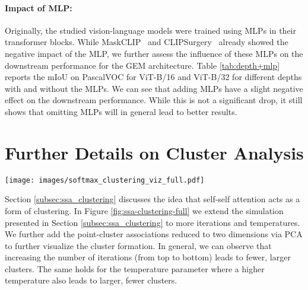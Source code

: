 \documentclass[10pt,twocolumn,letterpaper]{article}
\begin{document}
\paragraph{Impact of MLP:}
Originally, the studied vision-language models were trained using MLPs in their transformer blocks. While MaskCLIP~\citep{dong2023maskclip} and CLIPSurgery~\citep{li2023clipsurgery} already showed the negative impact of the MLP,  we further assess the influence of these MLPs on the downstream performance for the GEM architecture.
Table \ref{tab:depth+mlp} reports the mIoU on PascalVOC for ViT-B/16 and ViT-B/32 for different depths with and without the MLPs. We can see that adding MLPs have a slight negative effect on the downstream performance. While this is not a significant drop, it still shows that omitting MLPs will in general lead to better results.


\section{Further Details on Cluster Analysis} \label{appendix:analysis}

\begin{figure*}\centering
    \vspace{-1em}
\texttt{[image: images/softmax\_clustering\_viz\_full.pdf]}
    \vspace{-1.5em}
    \caption{
    Visualization of self-self attention on a set of 20 vectors: In the top 3 rows, a set of 20 vectors undergoing self-self attention for iterations   and temperatures . Displayed are the 20 data points (reduced to two dimensions via PCA) and their color represents a smooth cluster membership (the vector into which they are transformed is translated into a color value.) We further show the attention matrix for each configuration (the points were manually ordered for visual simplicity.) 
    It shows that as the number of iterations and/or the temperature increases, self-self attention produces larger fewer clusters.}
    \label{fig:ssa-clustering-full}
    \vspace{-1em}
\end{figure*}

Section \ref{subsec:ssa_clustering} discusses the idea that self-self attention acts as a form of clustering. In Figure \ref{fig:ssa-clustering-full} we extend the simulation presented in Section \ref{subsec:ssa_clustering} to more iterations and temperatures. We further add the point-cluster associations reduced to two dimensions via PCA to further visualize the cluster formation. In general, we can observe that increasing the number of iterations (from top to bottom) leads to fewer, larger clusters. The same holds for the temperature parameter where a higher temperature also leads to larger, fewer clusters.  
\end{document}
